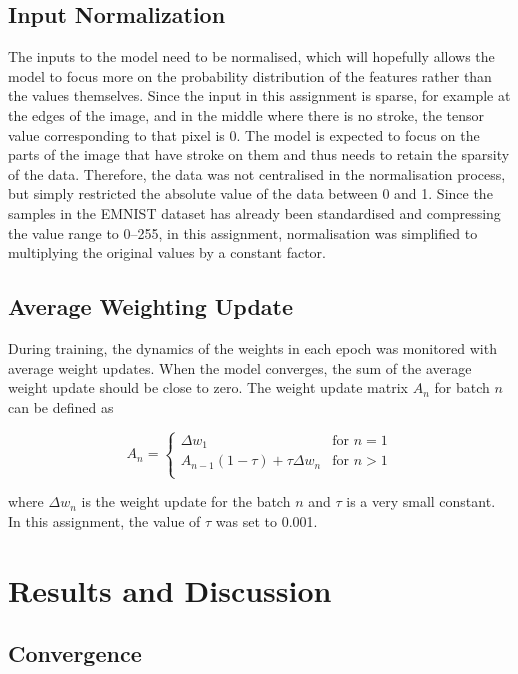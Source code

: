 \documentclass[conference]{IEEEtran}
\begin{document}
\subsection{Input Normalization}

The inputs to the model need to be normalised, which will hopefully allows the model to focus more on the probability distribution of the features rather than the values themselves. Since the input in this assignment is sparse, for example at the edges of the image, and in the middle where there is no stroke, the tensor value corresponding to that pixel is 0. The model is expected to focus on the parts of the image that have stroke on them and thus needs to retain the sparsity of the data. Therefore, the data was not centralised in the normalisation process, but simply restricted the absolute value of the data between 0 and 1. Since the samples in the EMNIST dataset has already been standardised and compressing the value range to 0--255, in this assignment, normalisation was simplified to multiplying the original values by a constant factor.

\subsection{Average Weighting Update}

During training, the dynamics of the weights in each epoch was monitored with average weight updates. When the model converges, the sum of the average weight update should be close to zero. The weight update matrix \(A_{n}\) for batch \(n\) can be defined as

\begin{equation}
    A_{n}=
    \begin{cases}
        \Delta w_1 &\text{for }n=1\\
        A_{n-1}(1-\tau)+\tau\Delta w_{n} &\text{for }n>1\\
    \end{cases}
\end{equation}

where \(\Delta w_{n}\) is the weight update for the batch \(n\) and \({\tau}\) is a very small constant. In this assignment, the value of \({\tau}\) was set to 0.001.

\section{Results and Discussion}

\subsection{Convergence}
\end{document}
